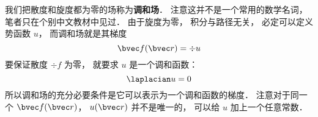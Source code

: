 
\begin{issues}
\issueDraft
\end{issues}


我们把散度和旋度都为零的场称为\textbf{调和场}． 注意这并不是一个常用的数学名词， 笔者只在个别中文教材中见过． 由于旋度为零， 积分与路径无关， 必定可以定义势函数 $u$， 而调和场就是其梯度
\begin{equation}
\bvec f(\bvec r) = \div u
\end{equation}
要保证散度 $\div f$ 为零， 就要求 $u$ 是一个调和函数：
\begin{equation}
\laplacian u = 0
\end{equation}
所以调和场的充分必要条件是它可以表示为一个调和函数的梯度． 注意对于同一个 $\bvec f(\bvec r)$， $u(\bvec r)$ 并不是唯一的， 可以给 $u$ 加上一个任意常数．
